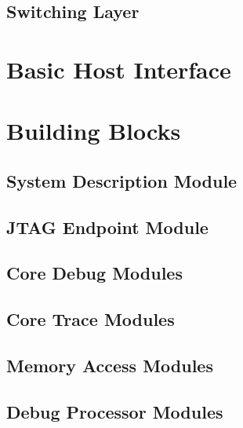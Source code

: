 \documentclass{scrartcl}
\begin{document}
\subsection*{Switching Layer}

\section*{Basic Host Interface}

\section*{Building Blocks}

\subsection*{System Description Module}

\subsection*{JTAG Endpoint Module}

\subsection*{Core Debug Modules}

\subsection*{Core Trace Modules}

\subsection*{Memory Access Modules}

\subsection*{Debug Processor Modules}
\end{document}

